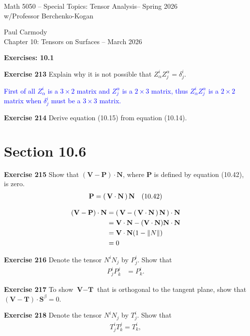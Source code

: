 \documentclass[12pt,a4paper]{report}
\newcommand{\CLASSNAME}{Math 5050 -- Special Topics: Tensor Analysis}
\newcommand{\STUDENTNAME}{Paul Carmody}
\newcommand{\ASSIGNMENT}{Chapter 10: Tensors on Surfaces }
\newcommand{\DUEDATE}{March 2026}
\newcommand{\PROFESSOR}{Professor Berchenko-Kogan}
\newcommand{\SEMESTER}{Spring 2026}
\newcommand{\BLUE}[1]{\textcolor{blue}{#1}}
\begin{document}
\begin{center}
	\Large{\CLASSNAME -- \SEMESTER} \\
	\large{ w/\PROFESSOR}
\end{center}
\begin{center}
	\STUDENTNAME \\
	\ASSIGNMENT -- \DUEDATE\\
\end{center} 

\noindent\textbf{Exercises: 10.1}
\begin{description}

\item \textbf{Exercise 213} Explain why it is not possible that $Z_\alpha^i Z_j^\alpha = \delta_j^i$.

\BLUE{First of all $Z_\alpha^i$ is a $3\times 2$ matrix and $Z_j^\alpha$ is a $2\times 3$ matrix, thus $Z_\alpha^i Z_j^\alpha$ is a $2 \times 2$ matrix when $\delta_j^i$ must be a $3 \times 3$ matrix.
}

\item \textbf{Exercise 214} Derive equation (10.15) from equation (10.14).

\section*{Section 10.6}
\item \textbf{Exercise 215} Show that $(\textbf{V}-\textbf{P})\cdot\textbf{N}$, where $\textbf{P}$ is defined by equation (10.42), is zero.
\begin{align*}
	\textbf{P} &= \left (\, \textbf{V}\cdot\textbf{N} \,\right )\textbf{N} & (10.42)
\end{align*}

\BLUE{\begin{align*}
	(\textbf{V}-\textbf{P})\cdot\textbf{N} &= \left (\, \textbf{V}-\left (\, \textbf{V}\cdot\textbf{N} \,\right )\textbf{N} \,\right )\cdot\textbf{N} \\
	&= \textbf{V}\cdot\textbf{N} - (\textbf{V}\cdot\textbf{N})\textbf{N}\cdot\textbf{N} \\
	&= \textbf{V}\cdot\textbf{N}(1-\|N\|) \\
	&= 0
\end{align*}
}

\item \textbf{Exercise 216} Denote the tensor $N^iN_j$ by $P_j^i$.  Show that 
\begin{align*}
	P_j^i P_k^j &= P_k^i.
\end{align*}
\item \textbf{Exercise 217} To show $\textbf{V}-\textbf{T}$ that is orthogonal to the tangent plane, show that $(\textbf{V}-\textbf{T})\cdot \textbf{S}^\beta = 0$.
\item \textbf{Exercise 218} Denote the tensor $N^iN_j$ by $T_j^i$. Show that 
\begin{align*}
	T_j^iT_k^j=T_k^i,
\end{align*}


\end{description}
\end{document}
